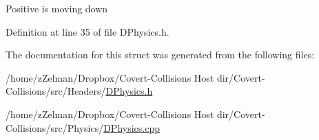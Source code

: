 Positive is moving down 

Definition at line 35 of file D\-Physics.\-h.



The documentation for this struct was generated from the following files\-:\begin{DoxyCompactItemize}
\item 
/home/z\-Zelman/\-Dropbox/\-Covert-\/\-Collisions Host dir/\-Covert-\/\-Collisions/src/\-Headers/\hyperlink{DPhysics_8h}{D\-Physics.\-h}\item 
/home/z\-Zelman/\-Dropbox/\-Covert-\/\-Collisions Host dir/\-Covert-\/\-Collisions/src/\-Physics/\hyperlink{DPhysics_8cpp}{D\-Physics.\-cpp}\end{DoxyCompactItemize}
